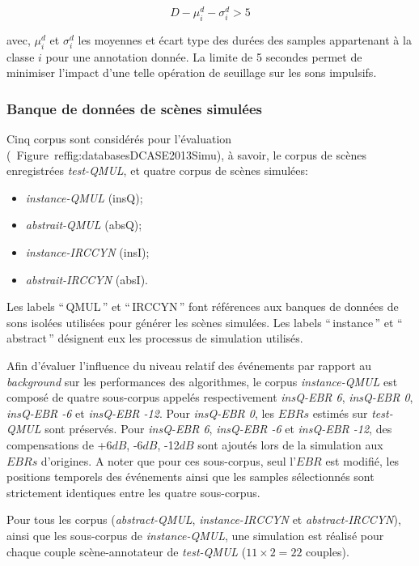 \begin{equation}
D-\mu_i^d-\sigma_i^d>5
\end{equation}

avec, $\mu_i^d$ et $\sigma_i^d$ les moyennes et écart type des durées des samples appartenant à la classe $i$ pour une annotation donnée. La limite de 5 secondes permet de minimiser l'impact d'une telle opération de seuillage sur les sons impulsifs.

\subsubsection{Banque de données de scènes simulées}
\label{sec:ch7_datasetEtEbr}

Cinq corpus sont considérés pour l'évaluation (\cf~Figure~ref{fig:databasesDCASE2013Simu}), à savoir, le corpus de scènes enregistrées \emph{test-QMUL}, et quatre corpus de scènes simulées:

\begin{itemize}
\item \emph{instance-QMUL} (insQ);
\item \emph{abstrait-QMUL} (absQ);
\item \emph{instance-IRCCYN} (insI);
\item \emph{abstrait-IRCCYN} (absI).
\end{itemize}

Les labels ``\,QMUL\,'' et ``\,IRCCYN\,'' font références aux banques de données de sons isolées utilisées pour générer les scènes simulées. Les labels ``\,instance\,'' et ``\,abstract\,'' désignent eux les processus de simulation utilisés. 

Afin d'évaluer l'influence du niveau relatif des événements par rapport au \emph{background} sur les performances des algorithmes, le corpus \emph{instance-QMUL} est composé de quatre sous-corpus appelés respectivement \emph{insQ-EBR 6}, \emph{insQ-EBR 0}, \emph{insQ-EBR -6} et \emph{insQ-EBR -12}. Pour \emph{insQ-EBR 0}, les $EBRs$ estimés sur \emph{test-QMUL} sont préservés.  Pour \emph{insQ-EBR 6}, \emph{insQ-EBR -6} et \emph{insQ-EBR -12}, des compensations de +6$dB$, -6$dB$, -12$dB$ sont ajoutés lors de la simulation aux $EBRs$ d'origines. A noter que pour ces sous-corpus, seul l'$EBR$ est modifié, les positions temporels des événements ainsi que les samples sélectionnés sont strictement identiques entre les quatre sous-corpus.

Pour tous les corpus (\emph{abstract-QMUL}, \emph{instance-IRCCYN} et \emph{abstract-IRCCYN}), ainsi que les sous-corpus de \emph{instance-QMUL}, une simulation est réalisé pour chaque couple scène-annotateur de \emph{test-QMUL} ($11\times2=22$ couples). 

